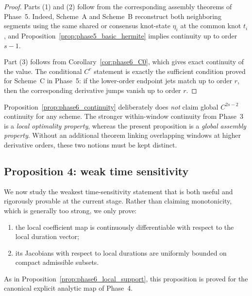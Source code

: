 \begin{proof}
Parts (1) and (2) follow from the corresponding assembly theorems of Phase~5.
Indeed, Scheme~A and Scheme~B reconstruct both neighboring segments using the same shared or consensus knot-state \(\eta_i\) at the common knot \(t_i\), and Proposition~\ref{prop:phase5_basic_hermite} implies continuity up to order \(s-1\).

Part (3) follows from Corollary~\ref{cor:phase6_C0}, which gives exact continuity of the value.
The conditional \(C^r\) statement is exactly the sufficient condition proved for Scheme~C in Phase~5: if the lower-order endpoint jets match up to order \(r\), then the corresponding derivative jumps vanish up to order \(r\).
\end{proof}

\begin{remark}
\label{rem:phase6_no_C2sminus2}
Proposition~\ref{prop:phase6_continuity} deliberately does \emph{not} claim global \(C^{2s-2}\) continuity for any scheme.
The stronger within-window continuity from Phase~3 is a \emph{local optimality property}, whereas the present proposition is a \emph{global assembly property}.
Without an additional theorem linking overlapping windows at higher derivative orders, these two notions must be kept distinct.
\end{remark}

\subsection{Proposition 4: weak time sensitivity}
\label{subsec:phase6_prop4}

We now study the weakest time-sensitivity statement that is both useful and rigorously provable at the current stage.
Rather than claiming monotonicity, which is generally too strong, we only prove:

\begin{enumerate}
    \item the local coefficient map is continuously differentiable with respect to the local duration vector;
    \item its Jacobians with respect to local durations are uniformly bounded on compact admissible subsets.
\end{enumerate}

As in Proposition~\ref{prop:phase6_local_support}, this proposition is proved for the canonical explicit analytic map of Phase~4.

